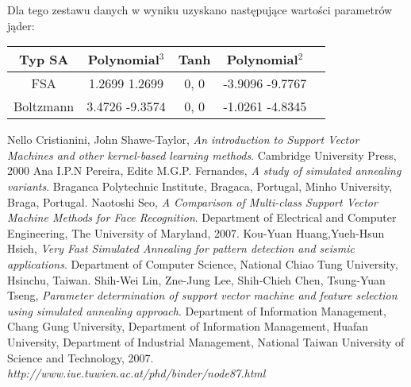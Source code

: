 \documentclass{article}
\begin{document}
Dla tego zestawu danych w wyniku uzyskano następujące wartości parametrów jąder:

\begin{center}
    \begin{tabular}{ | c | c | c | c | c | }
    \hline
    Typ SA & \textbf{Polynomial}$^{3}$ & \textbf{Tanh} & \textbf{Polynomial$^{2}$} \\ \hline
    FSA & 1.2699 1.2699 & 0, 0 & -3.9096 -9.7767 \\ \hline
	Boltzmann & 3.4726 -9.3574 & 0, 0 & -1.0261 -4.8345 \\ \hline
    \end{tabular}
\end{center}

\pagebreak
\begin{thebibliography}{9}
Nello Cristianini, John Shawe-Taylor, \emph{An introduction to Support Vector Machines and other kernel-based learning methods}.
Cambridge University Press,
2000
Ana I.P.N Pereira, Edite M.G.P. Fernandes, \emph{A study of simulated annealing variants}.
Braganca Polytechnic Institute, Bragaca, Portugal,
Minho University, Braga, Portugal.
Naotoshi Seo, \emph{A Comparison of Multi-class Support Vector Machine Methods for Face Recognition}. 
Department of Electrical and Computer Engineering, The University of Maryland, 
2007.
Kou-Yuan Huang,Yueh-Hsun Hsieh, \emph{Very Fast Simulated Annealing for pattern detection and seismic applications}. Department of Computer Science, National Chiao Tung University, Hsinchu, Taiwan.
Shih-Wei Lin, Zne-Jung Lee, Shih-Chieh Chen, Tsung-Yuan Tseng, \emph{Parameter determination of support vector machine and feature selection using simulated annealing approach}. Department of Information Management, Chang Gung University, Department of Information Management, Huafan University, Department of Industrial Management, National Taiwan University of Science and Technology, 2007.
\emph{http://www.iue.tuwien.ac.at/phd/binder/node87.html}
\end{thebibliography}
\end{document}
